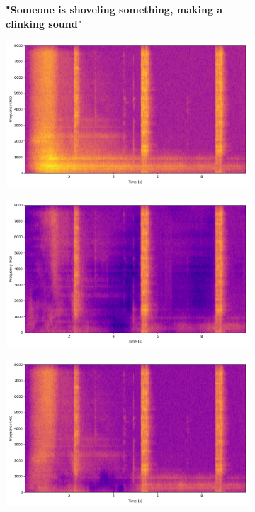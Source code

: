 \begin{figure}[htbp]
    \begin{subfigure}[b]{0.185\textwidth}
        \centering
        \scriptsize\textbf{"Someone is shoveling something, making a clinking sound"}
        \vspace{5.0mm}
    \end{subfigure}
    \begin{subfigure}[b]{0.185\textwidth}
        \centering
        \includegraphics[width=\textwidth]{plots/onepeace_best_sdri/onepeace mixture_spectrogram.png}
    \end{subfigure}
    \begin{subfigure}[b]{0.185\textwidth}
        \centering
        \includegraphics[width=\textwidth]{plots/onepeace_best_sdri/onepeace sep_spectrogram.png}
    \end{subfigure}
    \begin{subfigure}[b]{0.185\textwidth}
        \centering
        \includegraphics[width=\textwidth]{plots/onepeace_best_sdri/clap sep_spectrogram.png}

\end{subfigure}
\end{figure}

